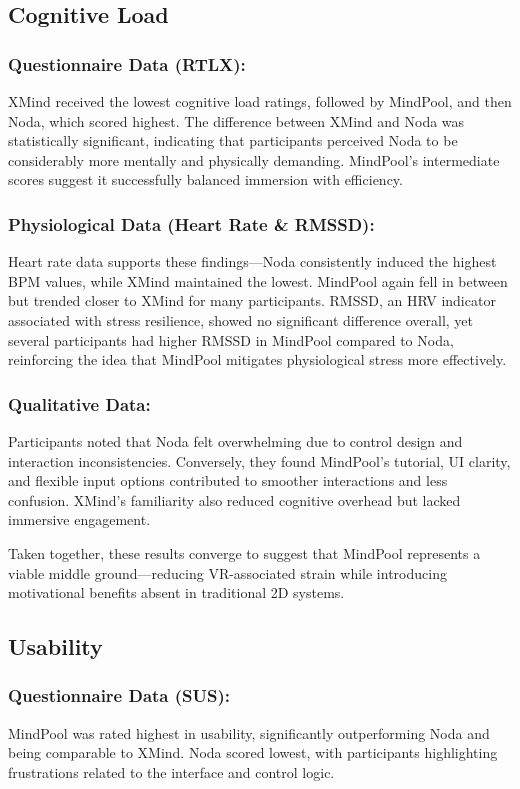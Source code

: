\documentclass{CPP}
\begin{document}
\subsection{Cognitive Load}

\subsubsection{Questionnaire Data (RTLX):}
 XMind received the lowest cognitive load ratings, followed by MindPool, and then Noda, which scored highest. The difference between XMind and Noda was statistically significant, indicating that participants perceived Noda to be considerably more mentally and physically demanding. MindPool’s intermediate scores suggest it successfully balanced immersion with efficiency.

\subsubsection{Physiological Data (Heart Rate & RMSSD):}
 Heart rate data supports these findings—Noda consistently induced the highest BPM values, while XMind maintained the lowest. MindPool again fell in between but trended closer to XMind for many participants. RMSSD, an HRV indicator associated with stress resilience, showed no significant difference overall, yet several participants had higher RMSSD in MindPool compared to Noda, reinforcing the idea that MindPool mitigates physiological stress more effectively.

\subsubsection{Qualitative Data:}
 Participants noted that Noda felt overwhelming due to control design and interaction inconsistencies. Conversely, they found MindPool’s tutorial, UI clarity, and flexible input options contributed to smoother interactions and less confusion. XMind’s familiarity also reduced cognitive overhead but lacked immersive engagement.

Taken together, these results converge to suggest that MindPool represents a viable middle ground—reducing VR-associated strain while introducing motivational benefits absent in traditional 2D systems.

\subsection{Usability}

\subsubsection{Questionnaire Data (SUS):}
 MindPool was rated highest in usability, significantly outperforming Noda and being comparable to XMind. Noda scored lowest, with participants highlighting frustrations related to the interface and control logic.
\end{document}
